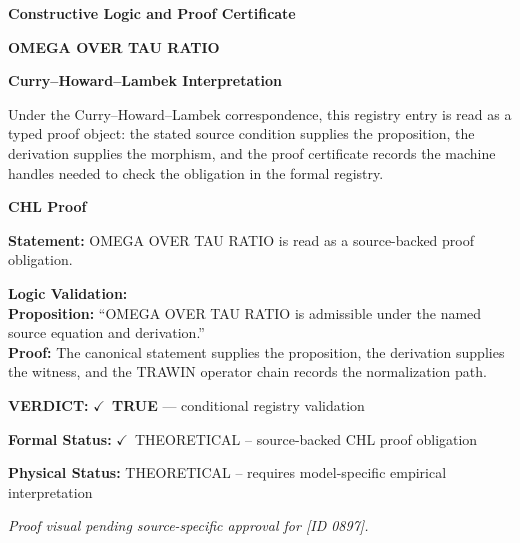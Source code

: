 \clearpage
\begingroup\tzpsupportsetup
\noindent\textbf{\fontsize{10.8pt}{12.8pt}\selectfont [ID 0897] Constructive Logic and Proof Certificate}\par
\noindent\textbf{\fontsize{10pt}{12pt}\selectfont OMEGA OVER TAU RATIO}\par
\vspace{0.45em}
\begingroup
\footnotesize
\setlength{\parskip}{0.22em}
\setlength{\parindent}{0pt}
\noindent\textbf{Curry--Howard--Lambek Interpretation}\par
Under the Curry--Howard--Lambek correspondence, this registry entry is read as a typed proof
object: the stated source condition supplies the proposition, the derivation supplies the
morphism, and the proof certificate records the machine handles needed to check the obligation
in the formal registry.

\vspace{0.45em}
\noindent\textbf{CHL Proof}\par
\textbf{Statement:} OMEGA OVER TAU RATIO is read as a source-backed proof obligation.

\textbf{Logic Validation:}\\
\textbf{Proposition:} ``OMEGA OVER TAU RATIO is admissible under the named source equation and derivation.''\\
\textbf{Proof:} The canonical statement supplies the proposition, the derivation supplies the witness, and the TRAWIN operator chain records the normalization path.

\textbf{VERDICT:} \ensuremath{\checkmark}\ \textbf{TRUE} --- conditional registry validation

\textbf{Formal Status:} \ensuremath{\checkmark}\ THEORETICAL -- source-backed CHL proof obligation

\textbf{Physical Status:} THEORETICAL -- requires model-specific empirical interpretation
\par\vspace{0.45em}
\par
\vfill
\begingroup\footnotesize\itshape
Proof visual pending source-specific approval for [ID 0897].
\par\endgroup
\vfill
\endgroup
\endgroup
